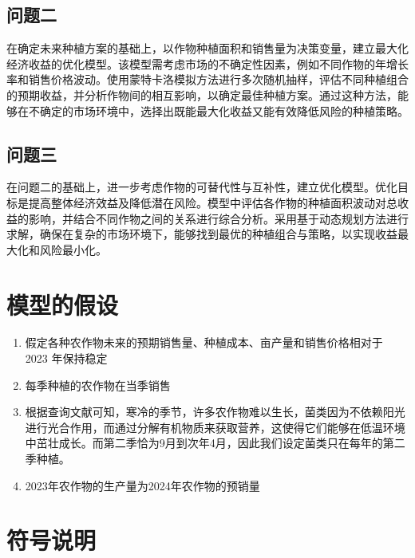 \documentclass[withoutpreface,bwprint]{cumcmthesis} %
\begin{document}
	\subsection{问题二}
	在确定未来种植方案的基础上，以作物种植面积和销售量为决策变量，建立最大化经济收益的优化模型。该模型需考虑市场的不确定性因素，例如不同作物的年增长率和销售价格波动。使用蒙特卡洛模拟方法进行多次随机抽样，评估不同种植组合的预期收益，并分析作物间的相互影响，以确定最佳种植方案。通过这种方法，能够在不确定的市场环境中，选择出既能最大化收益又能有效降低风险的种植策略。
	\subsection{问题三}
	
	在问题二的基础上，进一步考虑作物的可替代性与互补性，建立优化模型。优化目标是提高整体经济效益及降低潜在风险。模型中评估各作物的种植面积波动对总收益的影响，并结合不同作物之间的关系进行综合分析。采用基于动态规划方法进行求解，确保在复杂的市场环境下，能够找到最优的种植组合与策略，以实现收益最大化和风险最小化。
\section{模型的假设}
\begin{enumerate}
	\item 假定各种农作物未来的预期销售量、种植成本、亩产量和销售价格相对于 2023 年保持稳定
	\item 每季种植的农作物在当季销售

	\item 根据查询文献可知，寒冷的季节，许多农作物难以生长，菌类因为不依赖阳光进行光合作用，而通过分解有机物质来获取营养，这使得它们能够在低温环境中茁壮成长。而第二季恰为9月到次年4月，因此我们设定菌类只在每年的第二季种植。
	
	\item  2023年农作物的生产量为2024年农作物的预销量
\end{enumerate}
\section{符号说明}
\end{document}
